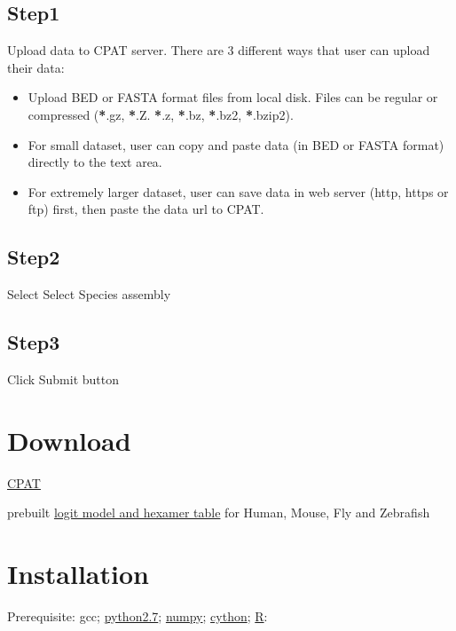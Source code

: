 \documentclass[letterpaper,10pt,english]{sphinxmanual}
\begin{document}
\section{Step1}
\label{index:step1}
Upload data to CPAT server. There are 3 different ways that user can upload their data:
\begin{itemize}
\item {} 
Upload BED or FASTA format files from local disk. Files can be regular or compressed ({\color{red}\bfseries{}*}.gz, {\color{red}\bfseries{}*}.Z. {\color{red}\bfseries{}*}.z, {\color{red}\bfseries{}*}.bz, {\color{red}\bfseries{}*}.bz2, {\color{red}\bfseries{}*}.bzip2).

\item {} 
For small dataset, user can copy and paste data (in BED or FASTA format) directly to the text area.

\item {} 
For extremely larger dataset, user can save data in web server (http, https or ftp) first, then paste the data url to CPAT.

\end{itemize}


\section{Step2}
\label{index:step2}
Select Select Species assembly


\section{Step3}
\label{index:step3}
Click Submit button


\chapter{Download}
\label{index:download}
\href{https://sourceforge.net/projects/rna-cpat/files/CPAT-1.2.1.tar.gz/download}{CPAT}

prebuilt \href{https://sourceforge.net/projects/rna-cpat/files/prebuilt\_models.zip/download}{logit model and hexamer table} for Human, Mouse, Fly and Zebrafish


\chapter{Installation}
\label{index:installation}
Prerequisite: gcc; \href{http://www.python.org/getit/releases/2.7/}{python2.7};  \href{http://numpy.scipy.org/}{numpy}; \href{http://cython.org/}{cython}; \href{http://www.r-project.org/}{R}:
\end{document}
